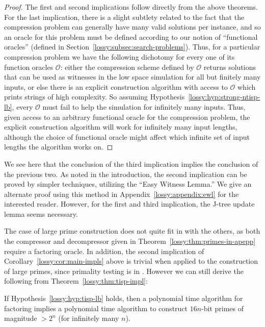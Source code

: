 \begin{proof}
The first and second implications follow directly from the above theorems. For the last implication, there is a slight subtlety  related to the fact that the compression problem can generally have many valid solutions per instance, and so an oracle for this problem must be defined according to our notion of ``functional oracles'' (defined in Section~\ref{lossy:subsec:search-problems}). Thus, for a particular compression problem we have the following dichotomy for every one of its function oracles $\mathcal{O}$: either the compression scheme defined by $\mathcal{O}$ returns solutions that can be used as witnesses in the low space simulation for all but finitely many inputs, or else there is an explicit construction algorithm with access to $\mathcal{O}$ which prints strings of high complexity. So assuming Hypothesis~\ref{lossy:hyp:strong-ntisp-lb}, every $\mathcal{O}$ must fail to help the simulation for infinitely many inputs. Thus, given access to an arbitrary functional oracle for the compression problem, the explicit construction algorithm will work for infinitely many input lengths, although the choice of functional oracle might affect which infinite set of input lengths the algorithm works on.
\end{proof}
We see here that the conclusion of the third implication implies the conclusion of the previous two. As noted in the introduction, the second implication can be proved by simpler techniques, utilizing the ``Easy Witness Lemma.'' We give an alternate proof using this method in Appendix~\ref{lossy:appendix:ewl} for the interested reader. However, for the first and third implication, the J-tree update lemma seems necessary.

The case of large prime construction does not quite fit in with the others, as both the compressor and decompressor given in Theorem~\ref{lossy:thm:primes-in-apepp} require a factoring oracle. In addition, the second implication of Corollary~\ref{lossy:cor:main-impls} above is trivial when applied to the construction of large primes, since primality testing is in  \cite{primes}. However we can still derive the following from Theorem~\ref{lossy:thm:tisp-impl}:
\begin{corollary}\label{lossy:cor:prime-construction}
If Hypothesis~\ref{lossy:hyp:tisp-lb} holds, then a polynomial time algorithm for factoring implies a polynomial time algorithm to construct $16n$-bit primes of magnitude $>2^n$ (for infinitely many $n$).
\end{corollary}

